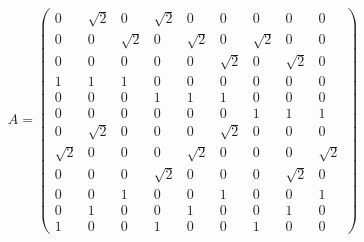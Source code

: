 \begin{equation}
    A =
    \begin{pmatrix}
        0 &         \sqrt{2} &  0 &         \sqrt{2} &  0 &         0 &         0 &         0 &         0           \\ 
        0 &         0 &         \sqrt{2} &  0 &         \sqrt{2} &  0 &         \sqrt{2} &  0 &         0           \\ 
        0 &         0 &         0 &         0 &         0 &         \sqrt{2} &  0 &         \sqrt{2} &  0           \\ 
        1 &         1 &         1 &         0 &         0 &         0 &         0 &         0 &         0           \\
        0 &         0 &         0 &         1 &         1 &         1 &         0 &         0 &         0           \\ 
        0 &         0 &         0 &         0 &         0 &         0 &         1 &         1 &         1           \\ 
        0 &         \sqrt{2} &  0 &         0 &         0 &         \sqrt{2} &  0 &         0 &         0           \\ 
        \sqrt{2} &  0 &         0 &         0 &         \sqrt{2} &  0 &         0 &         0 &         \sqrt{2}    \\ 
        0 &         0 &         0 &         \sqrt{2} &  0 &         0 &         0 &         \sqrt{2} &  0           \\ 
        0 &         0 &         1 &         0 &         0 &         1 &         0 &         0 &         1           \\ 
        0 &         1 &         0 &         0 &         1 &         0 &         0 &         1 &         0           \\ 
        1 &         0 &         0 &         1 &         0 &         0 &         1 &         0 &         0           
    \end{pmatrix}
\end{equation}

\vspace{60pt}
